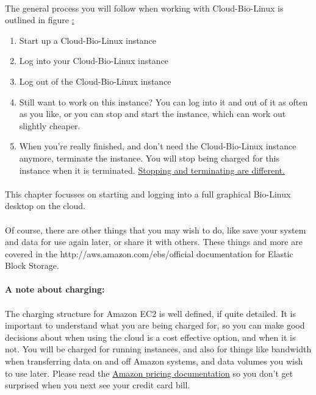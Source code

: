\paragraph{}The general process you will follow when working with Cloud-Bio-Linux is outlined in figure \href{fig:nutshell}:
\begin{enumerate}
\item Start up a Cloud-Bio-Linux instance
\item Log into your Cloud-Bio-Linux instance
\item Log out of the  Cloud-Bio-Linux instance
\item Still want to work on this instance? You can log into it and out of it as often as you like, or you can stop and start the instance, which can work out slightly cheaper.
\item When you're really finished, and don't need the Cloud-Bio-Linux instance anymore, terminate the instance. You will stop being charged for this instance when it is terminated. \href{http://support.rightscale.com/06-FAQs/FAQ\_0149\_-_What\%27s_the_difference_between_Terminating_and_Stopping_an_EC2_Instance\%3F}{Stopping and terminating are different.}
\end{enumerate}

\paragraph{}This chapter focusses on starting and logging into a full graphical Bio-Linux desktop on the cloud.

\paragraph{}Of course, there are other things that you may wish to do, like save your system and data for use again later, or share it with others. These things and more are covered in the {http://aws.amazon.com/ebs/}{official documentation for Elastic Block Storage}.

\paragraph{A note about charging:} 
\paragraph{}The charging structure for Amazon EC2 is well defined, if quite detailed. It is important to understand what you are being charged for, so you can make good decisions about when using the cloud is a cost effective option, and when it is not. You will be charged for running instances, and also for things like bandwidth when transferring data on and off Amazon systems, and data volumes you wish to use later. Please read the \href{http://aws.amazon.com/ec2/pricing/}{Amazon pricing documentation} so you don't get surprised when you next see your credit card bill. 
